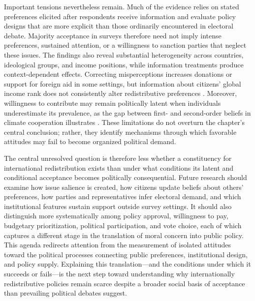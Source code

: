 \documentclass[11pt,a4paper]{article}
\begin{document}
Important tensions nevertheless remain. Much of the evidence relies on stated preferences elicited after respondents receive information and evaluate policy designs that are more explicit than those ordinarily encountered in electoral debate. Majority acceptance in surveys therefore need not imply intense preferences, sustained attention, or a willingness to sanction parties that neglect these issues. The findings also reveal substantial heterogeneity across countries, ideological groups, and income positions, while information treatments produce context-dependent effects. Correcting misperceptions increases donations or support for foreign aid in some settings, but information about citizens' global income rank does not consistently alter redistributive preferences \citep{nair_misperceptions_2018,fehr_your_2019}. Moreover, willingness to contribute may remain politically latent when individuals underestimate its prevalence, as the gap between first- and second-order beliefs in climate cooperation illustrates \citep{andre_globally_2024,mildenberger_beliefs_2017}. These limitations do not overturn the chapter's central conclusion; rather, they identify mechanisms through which favorable attitudes may fail to become organized political demand.

The central unresolved question is therefore less whether a constituency for international redistribution exists than under what conditions its latent and conditional acceptance becomes politically consequential. Future research should examine how issue salience is created, how citizens update beliefs about others' preferences, how parties and representatives infer electoral demand, and which institutional features sustain support outside survey settings. It should also distinguish more systematically among policy approval, willingness to pay, budgetary prioritization, political participation, and vote choice, each of which captures a different stage in the translation of moral concern into public policy. This agenda redirects attention from the measurement of isolated attitudes toward the political processes connecting public preferences, institutional design, and policy supply. Explaining this translation---and the conditions under which it succeeds or fails---is the next step toward understanding why internationally redistributive policies remain scarce despite a broader social basis of acceptance than prevailing political debates suggest.


\newpage


\end{document}
